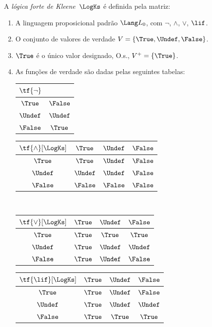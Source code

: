 \documentclass[../../../include/open-logic-section]{subfiles}
\begin{document}
\begin{defn}
A \emph{lógica forte de Kleene}~$\LogKs$ é definida pela matriz:
\begin{enumerate}
  \item A linguagem proposicional padrão $\Lang L_0$, com
  $\lnot$, $\land$, $\lor$, $\lif$.
  \item O conjunto de valores de verdade $V = \{\True, \Undef, \False\}$.
  \item $\True$ é o único valor designado, O.s.\@, $V^+ = \{\True\}$.
  \item As funções de verdade são dadas pelas seguintes tabelas:
  \begin{center}
    \begin{tabular}{c|c} 
      $\tf{\lnot}$ & \\ 
      \hline  
      $\True$ & $\False$ \\ 
      $\Undef$ & $\Undef$ \\
      $\False$ & $\True$ 
    \end{tabular}
    \quad
    \begin{tabular}{c|ccc} 
      $\tf{\land}[\LogKs]$ & $\True$ & $\Undef$ & $\False$ \\ 
      \hline 
      $\True$ & $\True$ & $\Undef$ & $\False$ \\ 
      $\Undef$ & $\Undef$ & $\Undef$ & $\False$\\ 
      $\False$ & $\False$ & $\False$ & $\False$ 
    \end{tabular}
    \\[2ex]
    \begin{tabular}{c|ccc} 
      $\tf{\lor}[\LogKs]$ & $\True$ & $\Undef$ & $\False$ \\ 
      \hline 
      $\True$ & $\True$ & $\True$ & $\True$ \\ 
      $\Undef$ & $\True$ & $\Undef$ & $\Undef$ \\
      $\False$ & $\True$ & $\Undef$ & $\False$ 
    \end{tabular}
    \quad
    \begin{tabular}{c|ccc} 
      $\tf{\lif}[\LogKs]$ & $\True$ & $\Undef$ & $\False$ \\ 
      \hline 
      $\True$ & $\True$ & $\Undef$ & $\False$ \\ 
      $\Undef$ & $\True$ & $\Undef$ & $\Undef$  \\ 
      $\False$ & $\True$ & $\True$ & $\True$ 
    \end{tabular}
  \end{center} 
\end{enumerate}
\end{defn}
\end{document}
